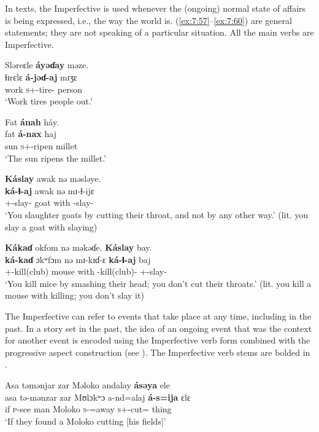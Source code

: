 In texts, the Imperfective is used whenever the (ongoing) normal state of affairs is being expressed, i.e., the way the world is. (\ref{ex:7:57}--\ref{ex:7:60}) are general statements; they are not speaking of a particular situation. All the main verbs are Imperfective. 

\ea\label{ex:7:57}
Sləreɛle  \textbf{áyəɗay} məze.\\
\gll  ɬɪrɛlɛ   \textbf{á-jəɗ{}-aj}      mɪʒɛ\\
      work  \textsc{s}+{\IFV}-tire{}-{\CL}  person\\
\glt  ‘Work tires people out.’\\
\z  

\ea\label{ex:7:58}
Fat  \textbf{ánah}  háy.\\
\gll  fat    \textbf{á-nax}    haj\\
      sun     \textsc{s}+{\IFV}-ripen  millet\\
\glt  ‘The sun ripens the millet.’ 
\z  

\ea\label{ex:7:59}
\textbf{Káslay} awak  nə  məsləye.\\
\gll  \textbf{ká-ɬ{}-aj}  awak  nə  mɪ-ɬ{}-ijɛ\\
      {\twoS}+{\IFV}-slay{}-{\CL}  goat  with  {\NOM}{}-slay-{\CL}\\
\glt  ‘You slaughter goats by cutting their throat, and not by any other way.’ (lit. you slay a goat with slaying)\\
\z 

\ea\label{ex:7:60}
\textbf{Kákaɗ}  okfom  nə  məkəɗe.  \textbf{Káslay} bay.\\
\gll  \textbf{ká-kaɗ}  ɔkʷfɔm  nə  mɪ-kɪɗ-ɛ      \textbf{ká-ɬ{}-aj}    baj\\
      {\twoS}+{\IFV}-kill(club)  mouse  with  {\NOM}{}-kill(club)-{\CL}  {\twoS}+{\IFV}-slay-{\CL}  {\NEG}\\
\glt  ‘You kill mice by smashing their head; you don’t cut their throats.’ (lit. you kill a mouse with killing; you don’t slay it)\\
\z  

The Imperfective can refer to events that take place at any time, including in the past.  In a story set in the past, the idea of an ongoing event that was the context for another event is encoded using the Imperfective verb form combined with the progressive aspect construction (see ). The Imperfective verb stems are bolded in . 

\ea\label{ex:7:61}
Asa  təmənjar  zar  Məloko  andalay  \textbf{ásəya}  ele  \\
\gll  asa  tə-mənzar    zar  Mʊlɔkʷɔ a-nd=alaj \textbf{á{}-s=ija} ɛlɛ \\
      if  \textsc{p}-see man Moloko  \textsc{s}-{\PRG}=away    \textsc{s}+{\IFV}-cut={\PLU}  thing  \\
 \glt ‘If they found a Moloko cutting [his fields]’\\     
 
